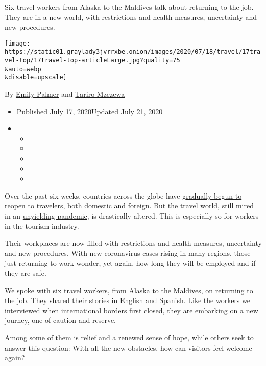 Six travel workers from Alaska to the Maldives talk about returning to
the job. They are in a new world, with restrictions and health measures,
uncertainty and new procedures.

\texttt{[image: https://static01.graylady3jvrrxbe.onion/images/2020/07/18/travel/17travel-top/17travel-top-articleLarge.jpg?quality=75\\\&auto=webp\\\&disable=upscale]}

By \href{https://www.nytimes3xbfgragh.onion/by/emily-palmer}{Emily
Palmer} and
\href{https://www.nytimes3xbfgragh.onion/by/tariro-mzezewa}{Tariro
Mzezewa}

\begin{itemize}
\item
  Published July 17, 2020Updated July 21, 2020
\item
  \begin{itemize}
  \item
  \item
  \item
  \item
  \item
  \end{itemize}
\end{itemize}

Over the past six weeks, countries across the globe have
\href{https://www.nytimes3xbfgragh.onion/2020/06/12/travel/reopening-europe-caribbean-virus.html}{gradually
begun to reopen} to travelers, both domestic and foreign. But the travel
world, still mired in an
\href{https://www.nytimes3xbfgragh.onion/news-event/coronavirus?action=click\&pgtype=Article\&state=default\&module=styln-coronavirus-national\&variant=show\&region=TOP_BANNER\&context=storylines_menu}{unyielding
pandemic}, is drastically altered. This is especially so for workers in
the tourism industry.

Their workplaces are now filled with restrictions and health measures,
uncertainty and new procedures. With new coronavirus cases rising in
many regions, those just returning to work wonder, yet again, how long
they will be employed and if they are safe.

We spoke with six travel workers, from Alaska to the Maldives, on
returning to the job. They shared their stories in English and Spanish.
Like the workers we
\href{https://www.nytimes3xbfgragh.onion/2020/03/25/travel/coronavirus-travel-hospitality-workers.html}{interviewed}
when international borders first closed, they are embarking on a new
journey, one of caution and reserve.

Among some of them is relief and a renewed sense of hope, while others
seek to answer this question: With all the new obstacles, how can
visitors feel welcome again?

